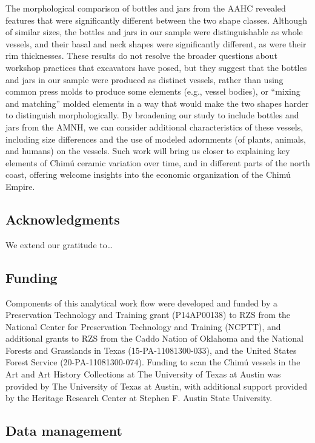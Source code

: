 \documentclass[]{interact}
\theoremstyle{plain}%
\theoremstyle{definition}
\theoremstyle{remark}
\begin{document}
The morphological comparison of bottles and jars from the AAHC revealed
features that were significantly different between the two shape
classes. Although of similar sizes, the bottles and jars in our sample
were distinguishable as whole vessels, and their basal and neck shapes
were significantly different, as were their rim thicknesses. These
results do not resolve the broader questions about workshop practices
that excavators have posed, but they suggest that the bottles and jars
in our sample were produced as distinct vessels, rather than using
common press molds to produce some elements (e.g., vessel bodies), or
``mixing and matching'' molded elements in a way that would make the two
shapes harder to distinguish morphologically. By broadening our study to
include bottles and jars from the AMNH, we can consider additional
characteristics of these vessels, including size differences and the use
of modeled adornments (of plants, animals, and humans) on the vessels.
Such work will bring us closer to explaining key elements of Chimú
ceramic variation over time, and in different parts of the north coast,
offering welcome insights into the economic organization of the Chimú
Empire.

\hypertarget{acknowledgments}{%
\subsection{Acknowledgments}\label{acknowledgments}}

We extend our gratitude to\ldots{}

\hypertarget{funding}{%
\subsection{Funding}\label{funding}}

Components of this analytical work flow were developed and funded by a
Preservation Technology and Training grant (P14AP00138) to RZS from the
National Center for Preservation Technology and Training (NCPTT), and
additional grants to RZS from the Caddo Nation of Oklahoma and the
National Forests and Grasslands in Texas (15-PA-11081300-033), and the
United States Forest Service (20-PA-11081300-074). Funding to scan the
Chimú vessels in the Art and Art History Collections at The University
of Texas at Austin was provided by The University of Texas at Austin,
with additional support provided by the Heritage Research Center at
Stephen F. Austin State University.

\hypertarget{data-management}{%
\subsection{Data management}\label{data-management}}
\end{document}
